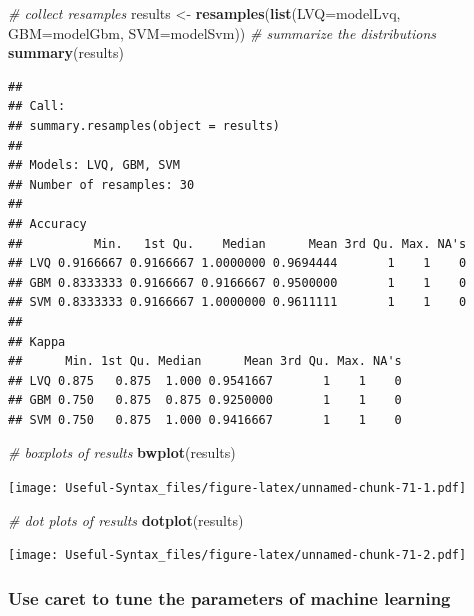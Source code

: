 \documentclass[
]{article}
\newenvironment{Shaded}{\begin{snugshade}}{\end{snugshade}}
\newcommand{\AttributeTok}[1]{\textcolor[rgb]{0.13,0.29,0.53}{#1}}
\newcommand{\CommentTok}[1]{\textcolor[rgb]{0.56,0.35,0.01}{\textit{#1}}}
\newcommand{\FunctionTok}[1]{\textcolor[rgb]{0.13,0.29,0.53}{\textbf{#1}}}
\newcommand{\NormalTok}[1]{#1}
\newcommand{\OtherTok}[1]{\textcolor[rgb]{0.56,0.35,0.01}{#1}}
\begin{document}
\begin{Shaded}
\begin{Highlighting}[]
\CommentTok{\# collect resamples}
\NormalTok{results }\OtherTok{\textless{}{-}} \FunctionTok{resamples}\NormalTok{(}\FunctionTok{list}\NormalTok{(}\AttributeTok{LVQ=}\NormalTok{modelLvq, }\AttributeTok{GBM=}\NormalTok{modelGbm, }\AttributeTok{SVM=}\NormalTok{modelSvm))}
\CommentTok{\# summarize the distributions}
\FunctionTok{summary}\NormalTok{(results)}
\end{Highlighting}
\end{Shaded}

\begin{verbatim}
## 
## Call:
## summary.resamples(object = results)
## 
## Models: LVQ, GBM, SVM 
## Number of resamples: 30 
## 
## Accuracy 
##          Min.   1st Qu.    Median      Mean 3rd Qu. Max. NA's
## LVQ 0.9166667 0.9166667 1.0000000 0.9694444       1    1    0
## GBM 0.8333333 0.9166667 0.9166667 0.9500000       1    1    0
## SVM 0.8333333 0.9166667 1.0000000 0.9611111       1    1    0
## 
## Kappa 
##      Min. 1st Qu. Median      Mean 3rd Qu. Max. NA's
## LVQ 0.875   0.875  1.000 0.9541667       1    1    0
## GBM 0.750   0.875  0.875 0.9250000       1    1    0
## SVM 0.750   0.875  1.000 0.9416667       1    1    0
\end{verbatim}

\begin{Shaded}
\begin{Highlighting}[]
\CommentTok{\# boxplots of results}
\FunctionTok{bwplot}\NormalTok{(results)}
\end{Highlighting}
\end{Shaded}

\texttt{[image: Useful-Syntax\_files/figure-latex/unnamed-chunk-71-1.pdf]}

\begin{Shaded}
\begin{Highlighting}[]
\CommentTok{\# dot plots of results}
\FunctionTok{dotplot}\NormalTok{(results)}
\end{Highlighting}
\end{Shaded}

\texttt{[image: Useful-Syntax\_files/figure-latex/unnamed-chunk-71-2.pdf]}

\hypertarget{use-caret-to-tune-the-parameters-of-machine-learning}{%
\subsubsection{Use caret to tune the parameters of machine learning}\label{use-caret-to-tune-the-parameters-of-machine-learning}}
\end{document}
